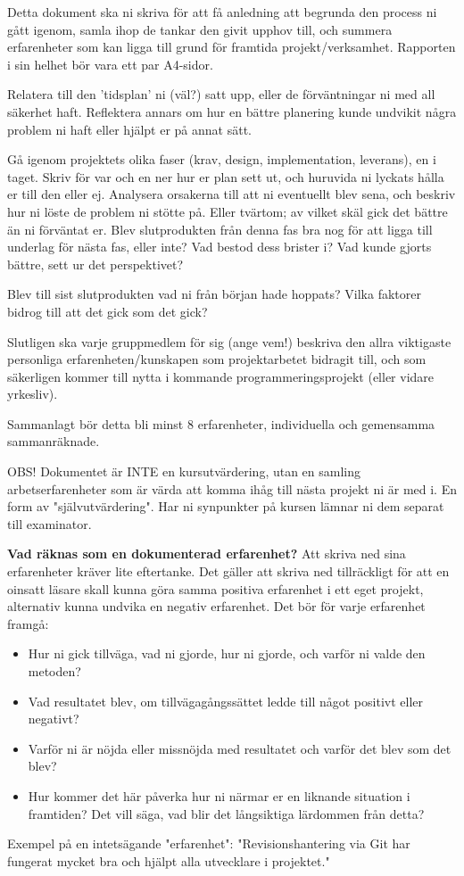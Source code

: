 

Detta dokument ska ni skriva för att få anledning att begrunda den process ni gått igenom, samla ihop de tankar den givit upphov till,
och summera erfarenheter som kan ligga till grund för framtida projekt/verksamhet. Rapporten i sin helhet bör vara ett par A4-sidor.

Relatera till den 'tidsplan' ni (väl?) satt upp, eller de förväntningar ni med all säkerhet haft. Reflektera annars om hur en bättre
planering kunde undvikit några problem ni haft eller hjälpt er på annat sätt.

Gå igenom projektets olika faser (krav, design, implementation, leverans), en i taget. Skriv för var och en ner hur er plan sett ut,
och huruvida ni lyckats hålla er till den eller ej. Analysera orsakerna till att ni eventuellt blev sena, och beskriv hur ni löste de
problem ni stötte på. Eller tvärtom; av vilket skäl gick det bättre än ni förväntat er. Blev slutprodukten från denna fas bra nog för
att ligga till underlag för nästa fas, eller inte? Vad bestod dess brister i? Vad kunde gjorts bättre, sett ur det perspektivet?

Blev till sist slutprodukten vad ni från början hade hoppats? Vilka faktorer bidrog till att det gick som det gick?

Slutligen ska varje gruppmedlem för sig (ange vem!) beskriva den allra viktigaste personliga erfarenheten/kunskapen som projektarbetet
bidragit till, och som säkerligen kommer till nytta i kommande programmeringsprojekt (eller vidare yrkesliv).

Sammanlagt bör detta bli minst 8 erfarenheter, individuella och gemensamma sammanräknade.

OBS! Dokumentet är INTE en kursutvärdering, utan en samling arbetserfarenheter som är värda att komma ihåg till nästa projekt ni är med i.
En form av "självutvärdering". Har ni synpunkter på kursen lämnar ni dem separat till examinator.

\textbf{Vad räknas som en dokumenterad erfarenhet?}
Att skriva ned sina erfarenheter kräver lite eftertanke. Det gäller att skriva ned tillräckligt för att en oinsatt läsare skall kunna göra
samma positiva erfarenhet i ett eget projekt, alternativ kunna undvika en negativ erfarenhet. Det bör för varje erfarenhet framgå:

\begin{itemize}
  \item Hur ni gick tillväga, vad ni gjorde, hur ni gjorde, och varför ni valde den metoden?
  \item Vad resultatet blev, om tillvägagångssättet ledde till något positivt eller negativt?
  \item Varför ni är nöjda eller missnöjda med resultatet och varför det blev som det blev?
  \item Hur kommer det här påverka hur ni närmar er en liknande situation i framtiden? Det vill säga, vad blir det långsiktiga lärdommen från detta?
\end{itemize}
Exempel på en intetsägande "erfarenhet": "Revisionshantering via Git har fungerat mycket bra och hjälpt alla utvecklare i projektet."

